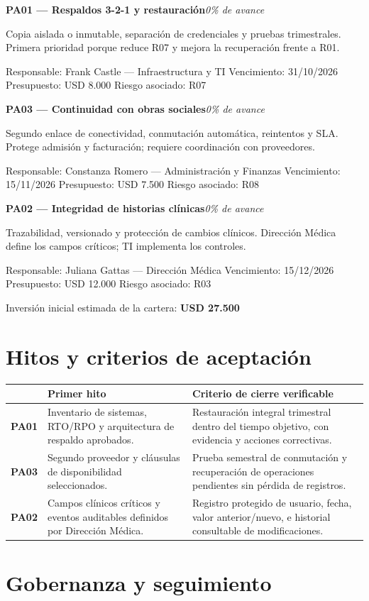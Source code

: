 \documentclass[10pt,a4paper]{article}
\newcommand{\planrow}[6]{%
\noindent\textbf{#1}\hfill \textit{0\% de avance}\par
\small #2\par
{\small\color{muted}Responsable: #3 \quad\textbar\quad Vencimiento: #4 \quad\textbar\quad Presupuesto: #5 \quad\textbar\quad Riesgo asociado: #6}
\par\vspace{2.5mm}}
\begin{document}
\planrow{PA01 --- Respaldos 3-2-1 y restauración}
{Copia aislada o inmutable, separación de credenciales y pruebas trimestrales. Primera prioridad porque reduce R07 y mejora la recuperación frente a R01.}
{Frank Castle --- Infraestructura y TI}{31/10/2026}{USD 8.000}{R07}

\planrow{PA03 --- Continuidad con obras sociales}
{Segundo enlace de conectividad, conmutación automática, reintentos y SLA. Protege admisión y facturación; requiere coordinación con proveedores.}
{Constanza Romero --- Administración y Finanzas}{15/11/2026}{USD 7.500}{R08}

\planrow{PA02 --- Integridad de historias clínicas}
{Trazabilidad, versionado y protección de cambios clínicos. Dirección Médica define los campos críticos; TI implementa los controles.}
{Juliana Gattas --- Dirección Médica}{15/12/2026}{USD 12.000}{R03}

\vspace{1mm}
{\small\color{muted}Inversión inicial estimada de la cartera: \textbf{\color{ink}USD 27.500}}

\section*{Hitos y criterios de aceptación}

\small
\begin{tabularx}{\linewidth}{>{\bfseries}m{1.1cm} X X}
\toprule
& \textbf{Primer hito} & \textbf{Criterio de cierre verificable}\\
\midrule
PA01 & Inventario de sistemas, RTO/RPO y arquitectura de respaldo aprobados. & Restauración integral trimestral dentro del tiempo objetivo, con evidencia y acciones correctivas.\\
PA03 & Segundo proveedor y cláusulas de disponibilidad seleccionados. & Prueba semestral de conmutación y recuperación de operaciones pendientes sin pérdida de registros.\\
PA02 & Campos clínicos críticos y eventos auditables definidos por Dirección Médica. & Registro protegido de usuario, fecha, valor anterior/nuevo, e historial consultable de modificaciones.\\
\bottomrule
\end{tabularx}
\normalsize

\section*{Gobernanza y seguimiento}
\end{document}
